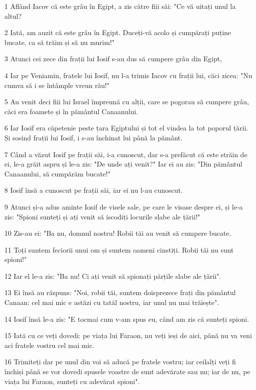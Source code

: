 \par 1 Aflând Iacov că este grâu în Egipt, a zis către fiii săi: "Ce vă uitați unul la altul?
\par 2 Iată, am auzit că este grâu în Egipt. Duceți-vă acolo și cumpărați puține bucate, ca să trăim și să nu murim!"
\par 3 Atunci cei zece din frații lui Iosif s-au dus să cumpere grâu din Egipt,
\par 4 Iar pe Veniamin, fratele lui Iosif, nu l-a trimis Iacov cu frații lui, căci zicea: "Nu cumva să i se întâmple vreun rău!"
\par 5 Au venit deci fiii lui Israel împreună cu alții, care se pogorau să cumpere grâu, căci era foamete și în pământul Canaanului.
\par 6 Iar Iosif era căpetenie peste țara Egiptului și tot el vindea la tot poporul țării. Și sosind frații lui Iosif, i s-au închinat lui până la pământ.
\par 7 Când a văzut Iosif pe frații săi, i-a cunoscut, dar s-a prefăcut că este străin de ei, le-a grăit aspru și le-a zis: "De unde ați venit?" Iar ei au zis: "Din pământul Canaanului, să cumpărăm bucate!"
\par 8 Iosif însă a cunoscut pe frații săi, iar ei nu l-au cunoscut.
\par 9 Atunci și-a adus aminte Iosif de visele sale, pe care le visase despre ei, și le-a zis: "Spioni sunteți și ați venit să iscodiți locurile slabe ale țării!"
\par 10 Zis-au ei: "Ba nu, domnul nostru! Robii tăi au venit să cumpere bucate.
\par 11 Toți suntem feciorii unui om și suntem oameni cinstiți. Robii tăi nu sunt spioni!"
\par 12 Iar el le-a zis: "Ba nu! Ci ați venit să spionați părțile slabe ale țării".
\par 13 Ei însă au răspuns: "Noi, robii tăi, suntem doisprezece frați din pământul Canaan: cel mai mic e astăzi cu tatăl nostru, iar unul nu mai trăiește".
\par 14 Iosif însă le-a zis: "E tocmai cum v-am spus eu, când am zis că sunteți spioni.
\par 15 Iată cu ce veți dovedi: pe viața lui Faraon, nu veți ieși de aici, până nu va veni aci fratele vostru cel mai mic.
\par 16 Trimiteți dar pe unul din voi să aducă pe fratele vostru; iar ceilalți veți fi închiși până se vor dovedi spusele voastre de sunt adevărate sau nu; iar de nu, pe viața lui Faraon, sunteți cu adevărat spioni".
